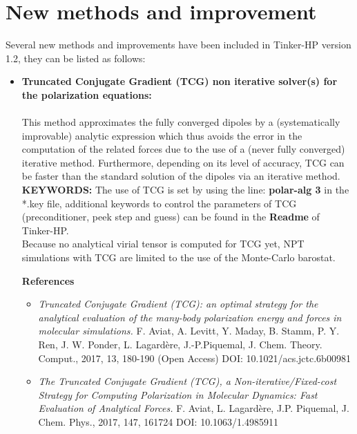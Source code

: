 \documentclass[]{article}
\begin{document}
\section{New methods and improvement}
Several new methods and improvements have been included in Tinker-HP version 1.2, they can be listed as follows:
\begin{itemize}
\item \textbf{Truncated Conjugate Gradient (TCG) non iterative solver(s) for the polarization equations:}
\\
\\
 This method approximates the fully converged dipoles by a (systematically improvable) analytic expression which thus avoids the error in the computation of the related forces due to the use of a (never fully converged) iterative method. Furthermore, depending on its level of accuracy, TCG can be faster than the standard solution of the dipoles via an iterative method.
 \\
 
\textbf{KEYWORDS:} The use of TCG is set by using the line: \textbf{polar-alg 3} in the *.key file, additional keywords to control the parameters of TCG (preconditioner, peek step and guess) can be found in the \textbf{Readme} of Tinker-HP.
\\
Because no analytical virial tensor is computed for TCG yet, NPT simulations with TCG are limited to the use of the Monte-Carlo barostat.

\textbf{References}

\begin{itemize}
    \item {\em Truncated Conjugate Gradient (TCG): an optimal strategy for the analytical evaluation of the many-body polarization energy and forces in molecular simulations.}
F. Aviat, A. Levitt, Y. Maday, B. Stamm, P. Y. Ren, J. W. Ponder, L. Lagardère, J.-P.Piquemal, J. Chem. Theory. Comput., 2017, 13, 180-190 (Open Access) DOI: 10.1021/acs.jctc.6b00981

\item {\em The Truncated Conjugate Gradient (TCG), a Non-iterative/Fixed-cost Strategy for Computing Polarization in Molecular Dynamics: Fast Evaluation of Analytical Forces.}
F. Aviat, L. Lagard\`ere, J.P. Piquemal, J. Chem. Phys., 2017, 147, 161724 
DOI: 10.1063/1.4985911
\end{itemize}


\end{itemize}
\end{document}
